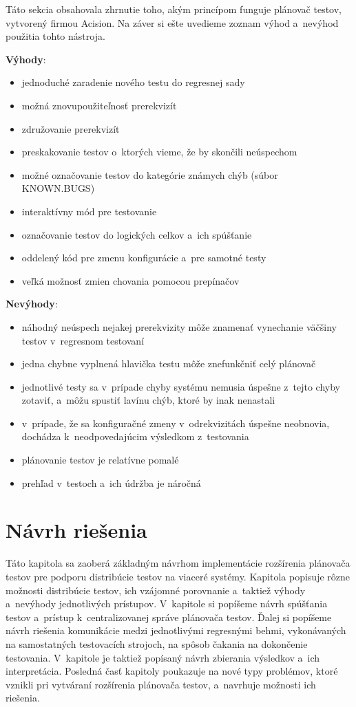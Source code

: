 Táto sekcia obsahovala zhrnutie toho, akým princípom funguje plánovač 
testov, vytvorený firmou Acision. Na záver si ešte uvedieme zoznam 
výhod a~nevýhod použitia tohto nástroja.

\noindent \textbf{Výhody}:
\begin{itemize}
\item jednoduché zaradenie nového testu do regresnej sady
\item možná znovupoužiteľnosť prerekvizít
\item združovanie prerekvizít
\item preskakovanie testov o~ktorých vieme, že by skončili neúspechom
\item možné označovanie testov do kategórie známych chýb (súbor KNOWN.BUGS)
\item interaktívny mód pre testovanie
\item označovanie testov do logických celkov a~ich spúšťanie
\item oddelený kód pre zmenu konfigurácie a~pre samotné testy
\item veľká možnosť zmien chovania pomocou prepínačov
\end{itemize} 

\noindent \textbf{Nevýhody}:
\begin{itemize}
\item náhodný neúspech nejakej prerekvizity môže znamenať vynechanie 
väčšiny testov v~regresnom testovaní
\item jedna chybne vyplnená hlavička testu môže znefunkčniť celý plánovač
\item jednotlivé testy sa v~prípade chyby systému nemusia úspešne z~tejto 
chyby zotaviť, a~môžu spustiť lavínu chýb, ktoré by inak nenastali 
\item v~prípade, že sa konfiguračné zmeny v~odrekvizitách úspešne neobnovia, 
dochádza k~neodpovedajúcim výsledkom z~testovania
\item plánovanie testov je relatívne pomalé
\item prehľad v~testoch a~ich údržba je náročná
\end{itemize}



%
%
\chapter{Návrh riešenia}
\label{kapitola:navrh_riesenia}
Táto kapitola sa zaoberá základným návrhom implementácie rozšírenia 
plánovača testov pre podporu distribúcie testov na viaceré systémy. 
Kapitola popisuje rôzne možnosti distribúcie testov, ich vzájomné 
porovnanie a~taktiež výhody a~nevýhody jednotlivých prístupov. 
V~kapitole si popíšeme návrh spúšťania testov a~prístup k~centralizovanej 
správe plánovača testov. Ďalej si popíšeme návrh riešenia komunikácie 
medzi jednotlivými regresnými behmi, vykonávaných na samostatných 
testovacích strojoch, na spôsob čakania na dokončenie testovania. 
V~kapitole je taktiež popísaný návrh zbierania výsledkov a~ich interpretácia.
Posledná časť kapitoly poukazuje na nové typy problémov, ktoré vznikli pri
vytváraní rozšírenia plánovača testov, a~navrhuje možnosti ich riešenia.


